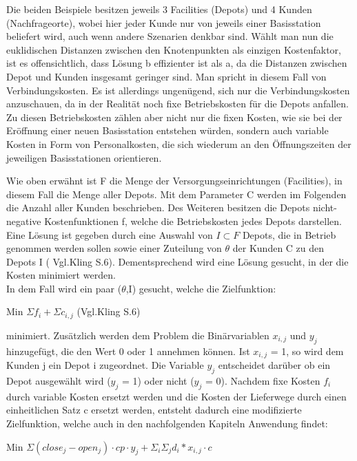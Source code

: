 \documentclass[a4paper,12pt,parskip,bibtotoc,liststotoc]{article}
\begin{document}
Die beiden Beispiele besitzen jeweils 3 Facilities (Depots) und 4 Kunden (Nachfrageorte), wobei hier jeder Kunde nur von jeweils einer Basisstation beliefert wird, auch wenn andere Szenarien denkbar sind.
Wählt man nun die euklidischen Distanzen zwischen den Knotenpunkten als einzigen Kostenfaktor, ist es offensichtlich, dass Lösung b effizienter ist als a, da die Distanzen zwischen Depot und Kunden insgesamt geringer sind. 
Man spricht in diesem Fall von Verbindungskosten. 
Es ist allerdings ungenügend, sich nur die Verbindungskosten anzuschauen, da in der Realität noch fixe Betriebskosten für die Depots anfallen.
Zu diesen Betriebskosten zählen aber nicht nur die fixen Kosten, wie sie bei der Eröffnung einer neuen Basisstation entstehen würden, sondern auch variable Kosten in Form von Personalkosten, die sich wiederum an den Öffnungszeiten der jeweiligen Basisstationen orientieren.

Wie oben erwähnt ist F die Menge der Versorgungseinrichtungen (Facilities), in diesem Fall die Menge aller Depots. 
Mit dem Parameter C werden im Folgenden die Anzahl aller Kunden beschrieben. 
Des Weiteren besitzen die Depots nicht-negative Kostenfunktionen f, welche die Betriebskosten jedes Depots darstellen. 
Eine Lösung ist gegeben durch eine Auswahl von $I \subset  F$ Depots, die in Betrieb genommen werden sollen sowie einer Zuteilung von $\theta$ der Kunden C zu den Depots I ( Vgl.Kling S.6).
Dementsprechend wird eine Lösung gesucht, in der die Kosten minimiert werden.\\

In dem Fall wird ein paar ($\theta$,I) gesucht, welche die Zielfunktion:

\begin{center}
Min $\Sigma f_{i}  + \Sigma c_{i,j}$ (Vgl.Kling S.6)
\end{center}
 
minimiert.
Zusätzlich werden dem Problem die Binärvariablen $x_{i,j}$ und $y_{j}$ hinzugefügt, die den Wert 0 oder 1 annehmen können. Ist $x_{i,j}$ = 1, so wird dem Kunden j ein Depot i zugeordnet. 
Die Variable  $y_{j}$ entscheidet darüber ob ein Depot ausgewählt wird ($y_{j}$ = 1) oder nicht ($y_{j}$ = 0). 
Nachdem fixe Kosten $f_{i}$ durch variable Kosten ersetzt werden und die Kosten der Lieferwege durch einen einheitlichen Satz c ersetzt werden, entsteht dadurch eine modifizierte Zielfunktion, welche auch in den nachfolgenden Kapiteln Anwendung findet:


\begin{center}
Min $\Sigma (close_{j}-open_{j})\cdot cp \cdot y_{j}  + \Sigma_{i}\Sigma_{j} d_{i}*x_{i,j} \cdot c$
\end{center}
\end{document}

